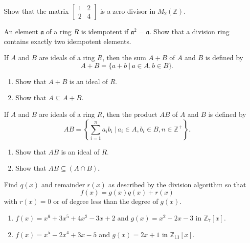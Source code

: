 \begin{mdframed}
    \vspace{0.752cm}
    \begin{Exercise}
        Show that the matrix $\begin{bmatrix}
            1 & 2 \\ 2 & 4
        \end{bmatrix}$ is a zero divisor in $M_2(\mathbb{Z})$.
    \end{Exercise}

    \vspace{0.752cm}
    \begin{Exercise}
        An element $\mathfrak{a}$ of a ring $R$ is idempotent if $\mathfrak{a}^2 = \mathfrak{a}$. Show that a division ring 
        contains exactly two idempotent elements.
    \end{Exercise}

    \vspace{0.752cm}
    \begin{Exercise}
        If $A$ and $B$ are ideals of a ring $R$, then the sum $A + B$ of $A$ and $B$ is defined by 
        \[
            A + B = \{ a + b \> | \> a \in A, b \in B \}.
        \]
        \begin{enumerate}
            \item Show that $A + B$ is an ideal of $R$.
            \item Show that $A \subseteq A + B$.
        \end{enumerate}
    \end{Exercise}

    \vspace{0.752cm}
    \begin{Exercise}
        If $A$ and $B$ are ideals of a ring $R$, then the product $AB$ of $A$ and $B$ is defined by 
        \[
            AB = \left\{ \sum^n_{i=1} a_ib_i \> \bigg | \> a_i \in A, b_i \in B, n \in \mathbb{Z}^+ \right\}.
        \]
        \begin{enumerate}
            \item Show that $AB$ is an ideal of $R$.
            \item Show that $AB \subseteq (A \cap B)$.
        \end{enumerate}
    \end{Exercise}

    \vspace{0.752cm}
    \begin{Exercise}
        Find $q(x)$ and remainder $r(x)$ as described by the division algorithm so that 
        \[
            f(x) = g(x)q(x) + r(x)
        \]
        with $r(x) = 0$ or of degree less than the degree of $g(x)$.
        \begin{enumerate}
            \item $f(x) = x^6 + 3x^5 + 4x^2 - 3x + 2$ and $g(x) = x^2 + 2x - 3$ in $\mathbb{Z}_7[x]$.
            \item $f(x) = x^5 - 2x^4 + 3x - 5$ and $g(x) = 2x + 1$ in $\mathbb{Z}_{11}[x]$.
        \end{enumerate}
    \end{Exercise}
\end{mdframed}